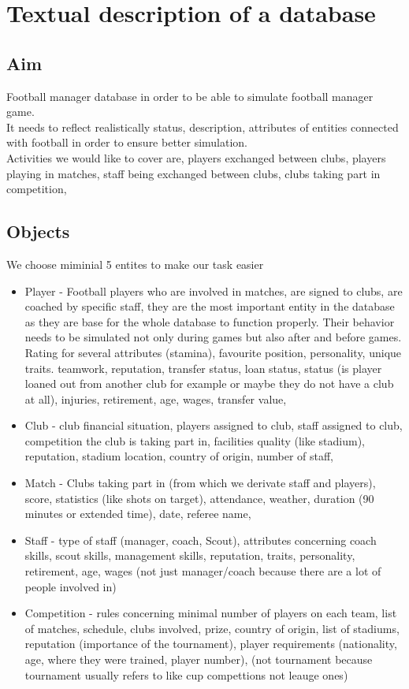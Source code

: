 \documentclass{report}
\begin{document}
\chapter{Textual description of a database}
\section{Aim}

Football manager database in order to be able to simulate football manager game. \\ 
It needs to reflect realistically status, description, attributes of entities connected with football in order to ensure better simulation. \\ 
Activities we would like to cover are, players exchanged between clubs, players playing in matches, staff being exchanged between clubs, clubs taking part in competition, 

\section{Objects}
We choose miminial 5 entites to make our task easier \\ 
\begin{itemize}
    \item Player - Football players who are involved in matches, are signed to clubs, are coached by specific staff, they are the most important entity in the database as they are base for the whole database to function properly. Their behavior needs to be simulated not only during games but also after and before games. Rating for several attributes (stamina), favourite position, personality, unique traits. teamwork, reputation, transfer status, loan status, status (is player loaned out from another club for example or maybe they do not have a club at all), injuries, retirement, age, wages, transfer value, 
    \item Club - club financial situation, players assigned to club, staff assigned to club, competition the club is taking part in, facilities quality (like stadium), reputation, stadium location, country of origin, number of staff,
    \item Match - Clubs taking part in (from which we derivate staff and players), score, statistics (like shots on target), attendance, weather, duration (90 minutes or extended time), date, referee name,
    \item Staff - type of staff (manager, coach, Scout), attributes concerning coach skills, scout skills, management skills, reputation, traits, personality, retirement, age, wages  (not just manager/coach because there are a lot of people involved in)
    \item Competition - rules concerning minimal number of players on each team, list of matches, schedule, clubs involved, prize, country of origin, list of stadiums, reputation (importance of the tournament), player requirements (nationality, age, where they were trained, player number),   (not tournament because tournament usually refers to like cup compettions not leauge ones)
\end{itemize} 
\end{document}
